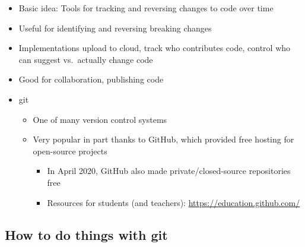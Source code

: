 \documentclass[
]{article}
\providecommand{\tightlist}{%
  \setlength{\itemsep}{0pt}\setlength{\parskip}{0pt}}
\begin{document}
\begin{itemize}
\item
  Basic idea: Tools for tracking and reversing changes to code over time
\item
  Useful for identifying and reversing breaking changes
\item
  Implementations upload to cloud, track who contributes code, control who can suggest vs.~actually change code
\item
  Good for collaboration, publishing code
\item
  git

  \begin{itemize}
  \tightlist
  \item
    One of many version control systems
  \item
    Very popular in part thanks to GitHub, which provided free hosting for open-source projects

    \begin{itemize}
    \tightlist
    \item
      In April 2020, GitHub also made private/closed-source repositories free
    \item
      Resources for students (and teachers): \url{https://education.github.com/}
    \end{itemize}
  \end{itemize}
\end{itemize}

\hypertarget{how-to-do-things-with-git}{%
\subsection{How to do things with git}\label{how-to-do-things-with-git}}
\end{document}
